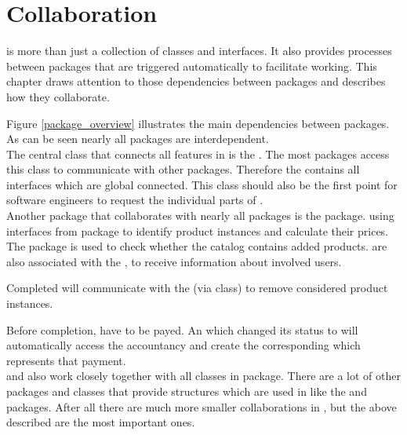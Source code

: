 \chapter{Collaboration}
\label{chap:collaboration}

\salespoint{} is more than just a collection of classes and interfaces. It also provides processes between packages that are triggered automatically to facilitate working. This chapter draws attention to those dependencies between packages and describes how they collaborate.  

Figure \ref{package_overview} illustrates the main dependencies between \salespoint{} packages. As can be seen nearly all packages are interdependent.\\ 

The central class that connects all features in \salespoint{} is the . The most packages access this class to communicate with other packages. Therefore the  contains all interfaces which are global connected. This class should also be the first point for software engineers to request the individual parts of \salespoint{}.\\

Another package that collaborates with nearly all packages is the  package.  using interfaces from  package to identify product instances and calculate their prices. The  package is used to check whether the catalog contains added products.  are also associated with the , to receive information about involved users.\par 
Completed  will communicate with the  (via  class) to remove considered product instances. \par
Before completion,  have to be payed. An  which changed its status to  will automatically access the accountancy and create the corresponding  which represents that payment.\\ 

 and  also work closely together with all classes in  package. There are a lot of other packages and classes that provide structures which are used in \salespoint{} like the  and  packages. After all there are much more smaller collaborations in \salespoint{}, but the above described are the most important ones.





